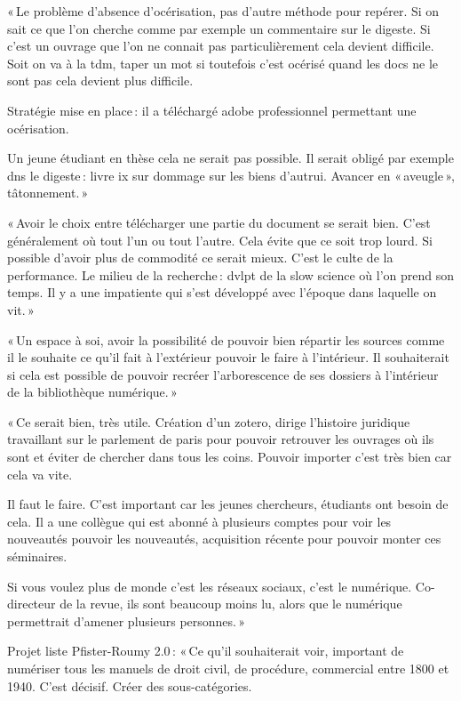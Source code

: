 « Le problème d’absence d’océrisation, pas d’autre méthode pour repérer. Si on sait ce que l’on cherche comme par exemple un commentaire sur le digeste. Si c’est un ouvrage que l’on ne connait pas particulièrement cela devient difficile. Soit on va à la tdm, taper un mot si toutefois c’est océrisé quand les docs ne le sont pas cela devient plus difficile.  

Stratégie mise en place : il a téléchargé adobe professionnel permettant une océrisation.  

Un jeune étudiant en thèse cela ne serait pas possible. Il serait obligé par exemple dns le digeste : livre ix sur dommage sur les biens d’autrui. Avancer en « aveugle », tâtonnement. » 

« Avoir le choix entre télécharger une partie du document se serait bien. C’est généralement où tout l’un ou tout l’autre. Cela évite que ce soit trop lourd. Si possible d’avoir plus de commodité ce serait mieux. C’est le culte de la performance. Le milieu de la recherche : dvlpt de la slow science où l’on prend son temps. Il y a une impatiente qui s’est développé avec l’époque dans laquelle on vit. » 

« Un espace à soi, avoir la possibilité de pouvoir bien répartir les sources comme il le souhaite ce qu’il fait à l’extérieur pouvoir le faire à l’intérieur. Il souhaiterait si cela est possible de pouvoir recréer l’arborescence de ses dossiers à l’intérieur de la bibliothèque numérique. » 

« Ce serait bien, très utile. Création d’un zotero, dirige l’histoire juridique travaillant sur le parlement de paris pour pouvoir retrouver les ouvrages où ils sont et éviter de chercher dans tous les coins. Pouvoir importer c’est très bien car cela va vite.  

Il faut le faire. C’est important car les jeunes chercheurs, étudiants ont besoin de cela. Il a une collègue qui est abonné à plusieurs comptes pour voir les nouveautés pouvoir les nouveautés, acquisition récente pour pouvoir monter ces séminaires. 

Si vous voulez plus de monde c’est les réseaux sociaux, c’est le numérique. Co-directeur de la revue, ils sont beaucoup moins lu, alors que le numérique permettrait d’amener plusieurs personnes. » 

Projet liste Pfister-Roumy 2.0 : « Ce qu’il souhaiterait voir, important de numériser tous les manuels de droit civil, de procédure, commercial entre 1800 et 1940. C’est décisif. Créer des sous-catégories.  

